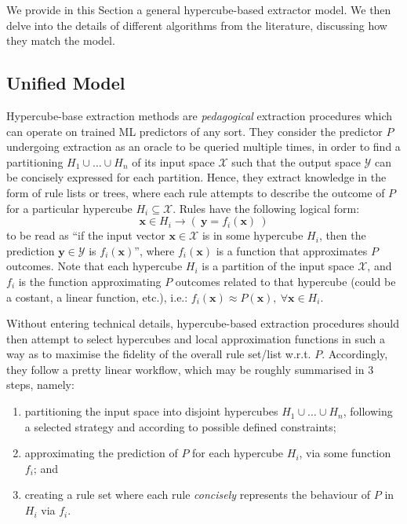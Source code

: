 \documentclass[
]{ceurart}
\begin{document}
We provide in this Section a general hypercube-based extractor model.
%
We then delve into the details of different algorithms from the literature, discussing how they match the model.

\subsection{Unified Model}

Hypercube-base extraction methods are \emph{pedagogical} extraction procedures which can operate on trained ML predictors of any sort.
%
They consider the predictor $P$ undergoing extraction as an oracle to be queried multiple times, in order to find a partitioning $H_1 \cup \ldots \cup H_n$ of its input space $\mathcal{X}$ such that the output space $\mathcal{Y}$ can be concisely %
expressed for each partition.
%
Hence, they extract knowledge in the form of rule lists or trees, where each rule attempts to describe the outcome of $P$ for a particular hypercube $H_i \subseteq \mathcal{X}$. 
%
Rules have the following logical form: 
%
\[ \mathbf{x} \in H_i \rightarrow (~\mathbf{y} = f_i(\mathbf{x})~) \]  
%
to be read as ``if the input vector $\mathbf{x} \in \mathcal{X}$ is in some hypercube $H_i$, then the prediction $\mathbf{y} \in \mathcal{Y}$ is $f_i(\mathbf{x})$'', where $f_i(\mathbf{x})$ is a function that approximates $P$ outcomes.
%
Note that each hypercube $H_i$ is a partition of the input space $\mathcal{X}$, and $f_i$ is the function approximating $P$ outcomes related to that hypercube (could be a costant, a linear function, etc.), i.e.: $f_i(\mathbf{x}) \approx P(\mathbf{x}),~\forall \mathbf{x} \in H_i$.

Without entering technical details, hypercube-based extraction procedures should then attempt to select hypercubes and local approximation functions in such a way as to maximise the fidelity of the overall rule set/list w.r.t. $P$.
%
Accordingly, they follow a pretty linear workflow, which may be roughly summarised in 3 steps, namely:
%
\begin{enumerate}
	\item partitioning the input space into disjoint hypercubes $H_1 \cup \ldots \cup H_n$, following a selected strategy and according to possible defined constraints;
	\item approximating the prediction of $P$ for each hypercube $H_i$, via some function $f_i$; and
	\item creating a rule set where each rule \emph{concisely} represents the behaviour of $P$ in $H_i$ via $f_i$.
\end{enumerate}
%
\end{document}

